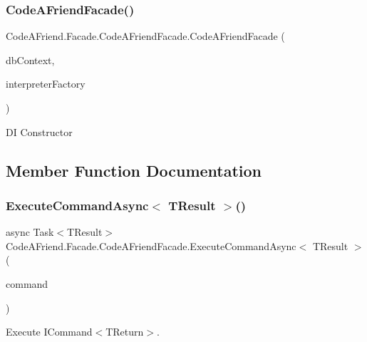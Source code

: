 \subsubsection{\texorpdfstring{Code\+A\+Friend\+Facade()}{CodeAFriendFacade()}}
{\footnotesize\ttfamily Code\+A\+Friend.\+Facade.\+Code\+A\+Friend\+Facade.\+Code\+A\+Friend\+Facade (\begin{DoxyParamCaption}\item[{Db\+Context}]{db\+Context,  }\item[{\mbox{\hyperlink{interface_code_a_friend_1_1_languages_1_1_core_1_1_i_interpreter_factory}{I\+Interpreter\+Factory}}}]{interpreter\+Factory }\end{DoxyParamCaption})}



DI Constructor



\subsection{Member Function Documentation}
\mbox{\label{class_code_a_friend_1_1_facade_1_1_code_a_friend_facade_a183e234ee3e7de4e25fb30121dd39891}} 
\subsubsection{\texorpdfstring{Execute\+Command\+Async$<$ T\+Result $>$()}{ExecuteCommandAsync< TResult >()}}
{\footnotesize\ttfamily async Task$<$T\+Result$>$ Code\+A\+Friend.\+Facade.\+Code\+A\+Friend\+Facade.\+Execute\+Command\+Async$<$ T\+Result $>$ (\begin{DoxyParamCaption}\item[{\mbox{\hyperlink{interface_code_a_friend_1_1_data_model_1_1_i_command}{I\+Command}}$<$ T\+Result $>$}]{command }\end{DoxyParamCaption})}



Execute I\+Command$<$\+T\+Return$>$. 



